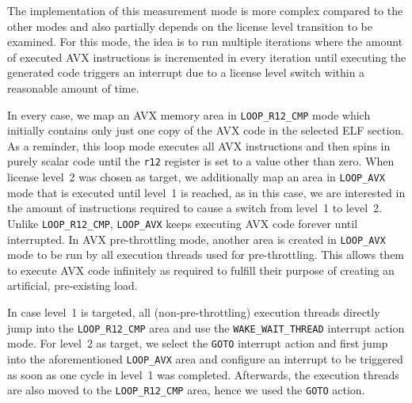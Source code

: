 The implementation of this measurement mode is more complex compared to the other modes and also partially depends on the license level transition to be examined. For this mode, the idea is to run multiple iterations where the amount of executed \gls{AVX} instructions is incremented in every iteration until executing the generated code triggers an interrupt due to a license level switch within a reasonable amount of time.

In every case, we map an \gls{AVX} memory area in \texttt{LOOP\_R12\_CMP} mode which initially contains only just one copy of the \gls{AVX} code in the selected \gls{ELF} section. As a reminder, this loop mode executes all \gls{AVX} instructions and then spins in purely scalar code until the \texttt{r12} register is set to a value other than zero. When license level~2 was chosen as target, we additionally map an area in \texttt{LOOP\_AVX} mode that is executed until level~1 is reached, as in this case, we are interested in the amount of instructions required to cause a switch from level~1 to level~2. Unlike \texttt{LOOP\_R12\_CMP}, \texttt{LOOP\_AVX} keeps executing \gls{AVX} code forever until interrupted. In \gls{AVX} pre-throttling mode, another area is created in \texttt{LOOP\_AVX} mode to be run by all execution threads used for pre-throttling. This allows them to execute \gls{AVX} code infinitely as required to fulfill their purpose of creating an artificial, pre-existing load.

In case level~1 is targeted, all (non-pre-throttling) execution threads directly jump into the \texttt{LOOP\_R12\_CMP} area and use the \texttt{WAKE\_WAIT\_THREAD} interrupt action mode. For level~2 as target, we select the \texttt{GOTO} interrupt action and first jump into the aforementioned \texttt{LOOP\_AVX} area and configure an interrupt to be triggered as soon as one cycle in level~1 was completed. Afterwards, the execution threads are also moved to the \texttt{LOOP\_R12\_CMP} area, hence we used the \texttt{GOTO} action. 

